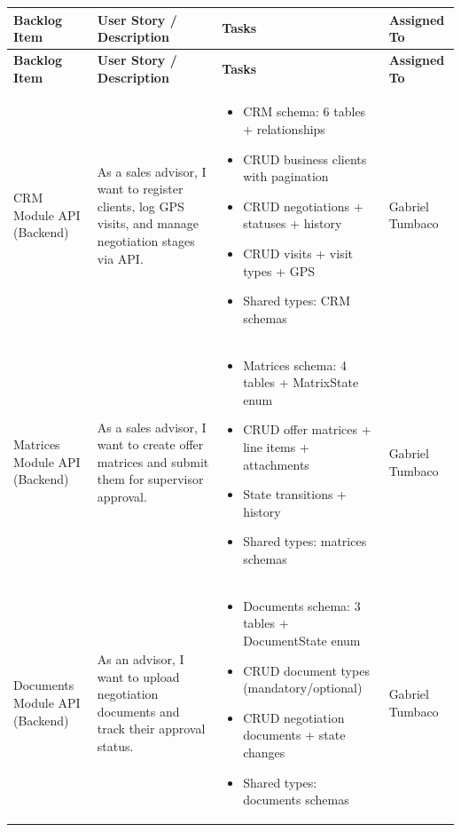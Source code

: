 \documentclass[letterpaper%
, oneside%
, 12pt%
, memoireprojet%
, english%
,creativecommons,hyperref, withAlgo2e %
]{thETS}
\begin{document}
\begingroup
\setlength{\LTleft}{-1.2cm plus -1fill}
\setlength{\LTright}{\LTleft}
\begin{longtable}{|p{3.2cm}|p{4.4cm}|p{5.4cm}|p{3.0cm}|}
\hline
\textbf{Backlog Item} & \textbf{User Story / Description} & \textbf{Tasks} & \textbf{Assigned To} \\ \hline
\endfirsthead
\hline
\textbf{Backlog Item} & \textbf{User Story / Description} & \textbf{Tasks} & \textbf{Assigned To} \\ \hline
\endhead
CRM Module API (Backend) & As a sales advisor, I want to register clients, log GPS visits, and manage negotiation stages via API. & \begin{itemize}\setlength{\itemsep}{2pt}
    \item CRM schema: 6 tables + relationships
    \item CRUD business clients with pagination
    \item CRUD negotiations + statuses + history
    \item CRUD visits + visit types + GPS
    \item Shared types: CRM schemas
\end{itemize} & Gabriel Tumbaco \\ \hline

Matrices Module API (Backend) & As a sales advisor, I want to create offer matrices and submit them for supervisor approval. & \begin{itemize}\setlength{\itemsep}{2pt}
    \item Matrices schema: 4 tables + MatrixState enum
    \item CRUD offer matrices + line items + attachments
    \item State transitions + history
    \item Shared types: matrices schemas
\end{itemize} & Gabriel Tumbaco \\ \hline

Documents Module API (Backend) & As an advisor, I want to upload negotiation documents and track their approval status. & \begin{itemize}\setlength{\itemsep}{2pt}
    \item Documents schema: 3 tables + DocumentState enum
    \item CRUD document types (mandatory/optional)
    \item CRUD negotiation documents + state changes
    \item Shared types: documents schemas
\end{itemize} & Gabriel Tumbaco \\ \hline


\end{longtable}
\end{document}
